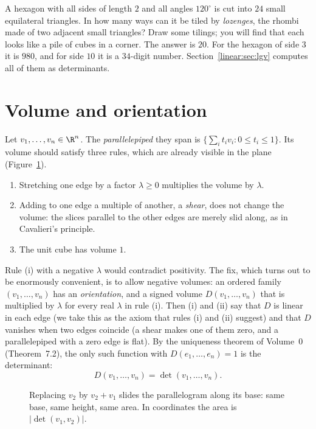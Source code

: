 \begin{think}
A hexagon with all sides of length $2$ and all angles $120^\circ$ is cut into $24$ small equilateral triangles. In how
many ways can it be tiled by \emph{lozenges}, the rhombi made of two adjacent small triangles? Draw some tilings; you
will find that each looks like a pile of cubes in a corner. The answer is $20$. For the hexagon of side $3$ it is $980$,
and for side $10$ it is a $34$-digit number. Section~\ref{linear:sec:lgv} computes all of them as determinants.
\end{think}

\section{Volume and orientation}

Let $v_1,\dots,v_n\in\R^n$. The \emph{parallelepiped} they span is $\{\sum_it_iv_i:0\le t_i\le1\}$. Its volume should
satisfy three rules, which are already visible in the plane (Figure~\ref{linear:fig:shear}).
\begin{enumerate}[label=(\roman*)]
\item Stretching one edge by a factor $\lambda\ge0$ multiplies the volume by $\lambda$.
\item Adding to one edge a multiple of another, a \emph{shear}, does not change the volume: the slices parallel to the
other edges are merely slid along, as in Cavalieri's principle.
\item The unit cube has volume $1$.
\end{enumerate}
Rule (i) with a negative $\lambda$ would contradict positivity. The fix, which turns out to be enormously convenient, is
to allow negative volumes: an ordered family $(v_1,\dots,v_n)$ has an \emph{orientation}, and a signed volume
$D(v_1,\dots,v_n)$ that is multiplied by $\lambda$ for every real $\lambda$ in rule (i). Then (i) and (ii) say that $D$
is linear in each edge (we take this as the axiom that rules (i) and (ii) suggest) and that $D$ vanishes when two
edges coincide (a shear makes one of them zero, and a
parallelepiped with a zero edge is flat). By the uniqueness theorem of Volume~0 (Theorem~7.2), the only such function with
$D(e_1,\dots,e_n)=1$ is the determinant:
\[
D(v_1,\dots,v_n)=\det(v_1,\dots,v_n).
\]

\begin{figure}[ht]
\centering
{}
\caption{Replacing $v_2$ by $v_2+v_1$ slides the parallelogram along its base: same base, same height, same area. In
coordinates the area is $|\det(v_1,v_2)|$.}
\label{linear:fig:shear}
\end{figure}

